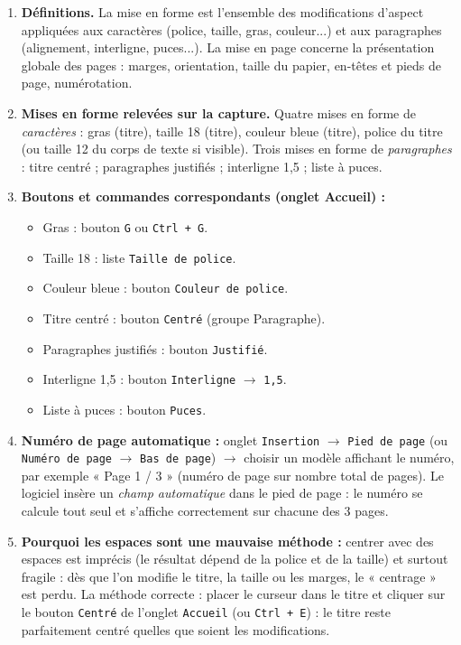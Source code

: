 \documentclass[11pt]{article}
\newcommand{\cle}[1]{{\popxbold\color{popdark}#1}}
\begin{document}
\begin{corrige}
\begin{enumerate}
\item \textbf{Définitions.} La \cle{mise en forme} est l'ensemble des modifications d'aspect appliquées aux caractères (police, taille, gras, couleur...) et aux paragraphes (alignement, interligne, puces...). La \cle{mise en page} concerne la présentation globale des pages : marges, orientation, taille du papier, en-têtes et pieds de page, numérotation.
\item \textbf{Mises en forme relevées sur la capture.}
Quatre mises en forme de \emph{caractères} : gras (titre), taille 18 (titre), couleur bleue (titre), police du titre (ou taille 12 du corps de texte si visible).
Trois mises en forme de \emph{paragraphes} : titre centré ; paragraphes justifiés ; interligne 1,5 ; liste à puces.
\item \textbf{Boutons et commandes correspondants (onglet Accueil) :}
\begin{itemize}
\item Gras : bouton \texttt{G} ou \texttt{Ctrl + G}.
\item Taille 18 : liste \texttt{Taille de police}.
\item Couleur bleue : bouton \texttt{Couleur de police}.
\item Titre centré : bouton \texttt{Centré} (groupe Paragraphe).
\item Paragraphes justifiés : bouton \texttt{Justifié}.
\item Interligne 1,5 : bouton \texttt{Interligne} $\to$ \texttt{1,5}.
\item Liste à puces : bouton \texttt{Puces}.
\end{itemize}
\item \textbf{Numéro de page automatique :} onglet \texttt{Insertion} $\to$ \texttt{Pied de page} (ou \texttt{Numéro de page} $\to$ \texttt{Bas de page}) $\to$ choisir un modèle affichant le numéro, par exemple « Page 1 / 3 » (numéro de page sur nombre total de pages). Le logiciel insère un \emph{champ automatique} dans le pied de page : le numéro se calcule tout seul et s'affiche correctement sur chacune des 3 pages.
\item \textbf{Pourquoi les espaces sont une mauvaise méthode :} centrer avec des espaces est imprécis (le résultat dépend de la police et de la taille) et surtout fragile : dès que l'on modifie le titre, la taille ou les marges, le « centrage » est perdu. La méthode correcte : placer le curseur dans le titre et cliquer sur le bouton \texttt{Centré} de l'onglet \texttt{Accueil} (ou \texttt{Ctrl + E}) : le titre reste parfaitement centré quelles que soient les modifications.

\end{enumerate}
\end{corrige}
\end{document}
